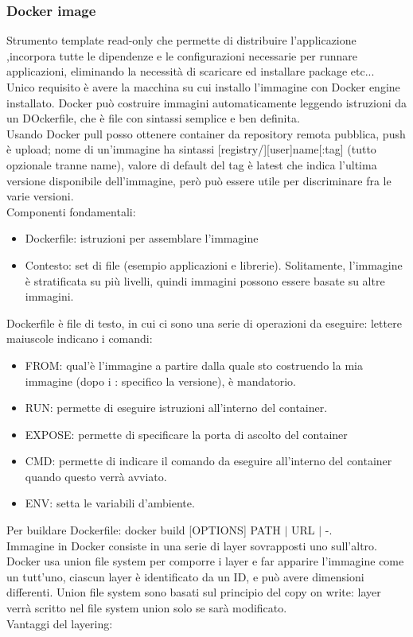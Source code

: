 \documentclass[16px]{article}
\begin{document}
\subsubsection{Docker image}
Strumento template read-only che permette di distribuire l'applicazione ,incorpora tutte le dipendenze e le configurazioni necessarie per runnare applicazioni, eliminando la necessità di scaricare ed installare package etc...\\ Unico requisito è avere la macchina su cui installo l'immagine con Docker engine installato. Docker può costruire immagini automaticamente leggendo istruzioni da un DOckerfile, che è file con sintassi semplice e ben definita.\\
Usando Docker pull posso ottenere container da repository remota pubblica, push è upload; nome di un'immagine ha sintassi [registry/][user]name[:tag] (tutto opzionale tranne name), valore di default del tag è latest che indica l'ultima versione disponibile dell'immagine, però può essere utile per discriminare fra le varie versioni.\\ Componenti fondamentali:
\begin{itemize}
\item Dockerfile: istruzioni per assemblare l'immagine
\item Contesto: set di file (esempio applicazioni e librerie). Solitamente, l'immagine è stratificata su più livelli, quindi immagini possono essere basate su altre immagini.
\end{itemize}
Dockerfile è file di testo, in cui ci sono una serie di operazioni da eseguire: lettere maiuscole indicano i comandi:
\begin{itemize}
\item FROM: qual'è l'immagine a partire dalla quale sto costruendo la mia immagine (dopo i : specifico la versione), è mandatorio.
\item RUN: permette di eseguire istruzioni all'interno del container.
\item EXPOSE: permette di specificare la porta di ascolto del container
\item CMD: permette di indicare il comando da eseguire all'interno del container quando questo verrà avviato.
\item ENV: setta le variabili d'ambiente.
\end{itemize}
Per buildare Dockerfile: docker build [OPTIONS] PATH $|$ URL $|$ -.\\ Immagine in Docker consiste in una serie di layer sovrapposti uno sull'altro. Docker usa union file system per comporre i layer e far apparire l'immagine come un tutt'uno, ciascun layer è identificato da un ID, e può avere dimensioni differenti. Union file system sono basati sul principio del copy on write: layer verrà scritto nel file system union solo se sarà modificato.\\ Vantaggi del layering:
\end{document}
